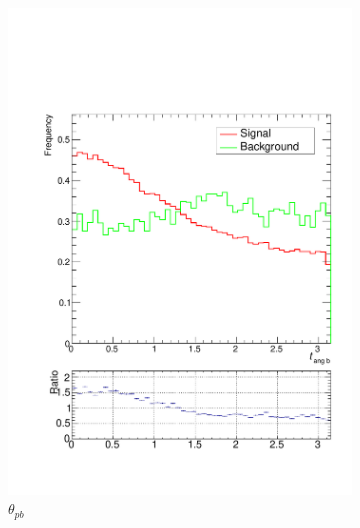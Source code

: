 \documentclass[10pt,a4paper]{book}
\begin{document}
\begin{figure}
\begin{subfigure}{.33\textwidth}
\includegraphics[scale=0.25]{truth/tang2}
\caption{$\theta_{pb}$}
\end{subfigure}
\begin{subfigure}{0.5\textwidth}
\centering

\end{subfigure}
\end{figure}
\end{document}
